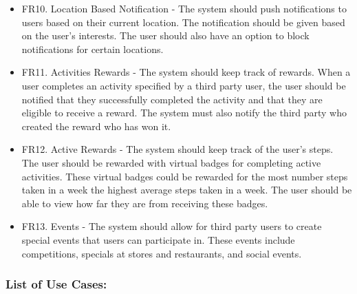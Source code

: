 \documentclass[11pt]{article}
\begin{document}
\begin{itemize}
			\item FR10. Location Based Notification - The system should push notifications to users based on their current location. The notification should be given based on the user's interests. The user should also have an option to block notifications for certain locations. 
			
			\item FR11. Activities Rewards - The system should keep track of rewards. When a user completes an activity specified by a third party user, the user should be notified that they successfully completed the activity and that they are eligible to receive a reward. The system must also notify the third party who created the reward who has won it.
			
			\item FR12. Active Rewards - The system should keep track of the user's steps. The user should be rewarded with virtual badges for completing active activities. These virtual badges could be rewarded for the most number steps taken in a week the highest average steps taken in a week. The user should be able to view how far they are from receiving these badges.
			
			\item FR13. Events - The system should allow for third party users to create special events that users can participate in. These events include competitions, specials at stores and restaurants, and social events. 
		\end{itemize}
		
		\subsubsection{List of Use Cases:}
		
\end{document}
